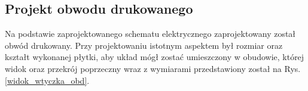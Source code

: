 \documentclass[12pt]{article} %
\numberwithin{equation}{subsection}
\numberwithin{figure}{section}
\numberwithin{table}{section}
\begin{document}
\newpage


	\subsection{Projekt obwodu drukowanego}
		\hspace{0.5cm}Na podstawie zaprojektowanego schematu elektrycznego zaprojektowany został obwód drukowany. Przy projektowaniu istotnym aspektem był rozmiar oraz kształt wykonanej płytki, aby układ mógł zostać umieszczony w obudowie, której widok oraz przekrój poprzeczny wraz z wymiarami przedstawiony został na Rys. \ref{widok_wtyczka_obd}.
		
		\begin{figure}[!h]
			\centering
			\subfigure[]{
}
\end{figure}
\end{document}
